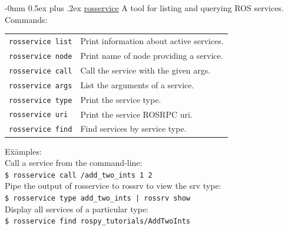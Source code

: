 \documentclass[10pt,landscape]{article}
\makeatletter
\renewcommand{\subsection}{\@startsection{subsection}{2}{0mm}%
                                {-0mm}%
                                {0.5ex plus .2ex}%
                                {\normalfont\normalsize\bfseries}}
\newenvironment{nstabbing}
  {\setlength{\topsep}{1pt}%
   \setlength{\partopsep}{1pt}%
   \tabbing}
  {\endtabbing}
\makeatother
\begin{document}
\begin{multicols}{3}
\subsection{\href{http://wiki.ros.org/rosservice}{rosservice}}
A tool for listing and querying ROS services.\\
Commands: \\
\begin{tabular}{p{\the\MyLen}%
                @{}p{\linewidth-\the\MyLen}@{}}
\texttt{rosservice list}  & Print information about active services. \\
\texttt{rosservice node}  & Print name of node providing a service. \\
\texttt{rosservice call}  & Call the service with the given args. \\
\texttt{rosservice args}  & List the arguments of a service. \\
\texttt{rosservice type}  & Print the service type. \\
\texttt{rosservice uri}   & Print the service ROSRPC uri. \\
\texttt{rosservice find}  & Find services by service type.
\end{tabular}
\begin{nstabbing}
E\=x\=amples:\\
\> Call a service from the command-line:\\
\> \>\texttt{\$ rosservice call /add\_two\_ints 1 2}\\
\> Pipe the output of rosservice to rossrv to view the srv type:\\
\> \>\texttt{\$ rosservice type add\_two\_ints | rossrv show}\\
\> Display all services of a particular type:\\
\> \>\texttt{\$ rosservice find rospy\_tutorials/AddTwoInts}\\
\end{nstabbing}


\end{multicols}
\end{document}

